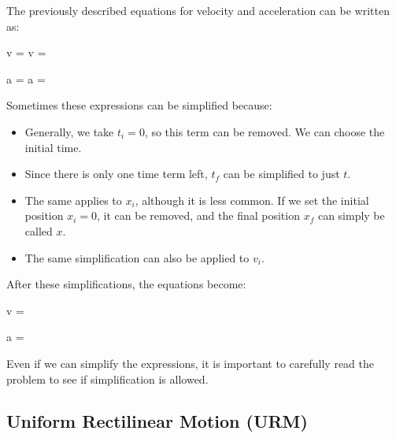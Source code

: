 The previously described equations for velocity and acceleration can be written as:
\begin{centeredequation}
    v =  \longrightarrow v = 
\end{centeredequation}
\begin{centeredequation}
    a =  \longrightarrow a = 
\end{centeredequation}
Sometimes these expressions can be simplified because:
\begin{itemize}
    \item Generally, we take \( t_i = 0 \), so this term can be removed.
    We can choose the initial time.
    \item Since there is only one time term left, \( t_f \) can be simplified to just \( t \).
    \item The same applies to \( x_i \), although it is less common.
    If we set the initial position \( x_i = 0 \), it can be removed, and the final position \( x_f \) can simply be called \( x \).
    \item The same simplification can also be applied to \( v_i \).
\end{itemize}
After these simplifications, the equations become:
\begin{centeredequation}
    v = 
\end{centeredequation}
\begin{centeredequation}
    a = 
\end{centeredequation}
\begin{remark}
    Even if we can simplify the expressions, it is important to carefully read the problem to see if simplification is allowed.
\end{remark}

\subsection{Uniform Rectilinear Motion (URM)}

